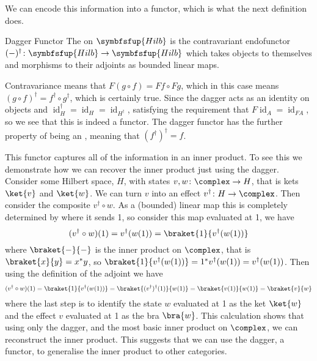 \documentclass[fleqn]{NotesClass}
\makeatletter
\newcommand{\c@egory}[1]{\symbfsfup{#1}}
\newcommand{\Hilb}{\c@egory{Hilb}}
\DeclareMathOperator{\id}{id}
\newcommand{\hermit}{\dagger}
\makeatother
\begin{document}
    We can encode this information into a functor, which is what the next definition does.
    
    \begin{dfn}{Dagger Functor}{}
        The \index{dagger functor!\(\Hilb\)} on \(\Hilb\) is the contravariant endofunctor \((-)^\dagger \colon \Hilb \to \Hilb\) which takes objects to themselves and morphisms to their adjoints as bounded linear maps.
    \end{dfn}
    
    Contravariance means that \(F(g \circ f) = Ff \circ Fg\), which in this case means \((g \circ f)^\dagger = f^\dagger \circ g^\dagger\), which is certainly true.
    Since the dagger acts as an identity on objects and \(\id_H^\dagger = \id_H = \id_{H^\dagger}\), satisfying the requirement that \(F\id_A = \id_{FA}\), so we see that this is indeed a functor.
    The dagger functor has the further property of being an , meaning that \((f^{\dagger})^{\dagger} = f\).
    
    This functor captures all of the information in an inner product.
    To see this we demonstrate how we can recover the inner product just using the dagger.
    Consider some Hilbert space, \(H\), with states \(v, w \colon \complex \to H\), that is kets \(\ket{v}\) and \(\ket{w}\).
    We can turn \(v\) into an effect \(v^\dagger \colon H \to \complex\).
    Then consider the composite \(v^\hermit \circ w\).
    As a (bounded) linear map this is completely determined by where it sends 1, so consider this map evaluated at 1, we have
    \begin{equation}
        (v^\dagger \circ w)(1) = v^\dagger(w(1)) = \braket{1}{v^\dagger(w(1))}
    \end{equation}
    where \(\braket{-}{-}\) is the inner product on \(\complex\), that is \(\braket{x}{y} = x^*y\), so \(\braket{1}{v^\dagger(w(1))} = 1^*v^\dagger(w(1)) = v^\dagger(w(1))\).
    Then using the definition of the adjoint we have
    \begin{equation}
        (v^\dagger \circ w)(1) = \braket{1}{v^\dagger(w(1))} = \braket{(v^\dagger)^\dagger(1)}{w(1)} = \braket{v(1)}{w(1)} = \braket{v}{w}
    \end{equation}
    where the last step is to identify the state \(w\) evaluated at 1 as the ket \(\ket{w}\) and the effect \(v\) evaluated at 1 as the bra \(\bra{w}\).
    This calculation shows that using only the dagger, and the most basic inner product on \(\complex\), we can reconstruct the inner product.
    This suggests that we can use the dagger, a functor, to generalise the inner product to other categories.
    
\end{document}
